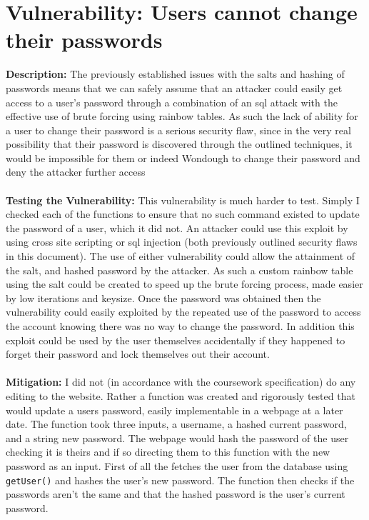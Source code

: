 \section{Vulnerability: Users cannot change their passwords}
\label{sec:background}
\textbf{Description:} The previously established issues with the salts and hashing of passwords means that we can safely assume that an attacker could easily get access to a user's
password through a combination of an sql attack with the effective use of brute forcing using rainbow tables. As such the lack of ability for a user to change their password is a
serious security flaw, since in the very real possibility that their password is discovered through the outlined techniques, it would be impossible for them or indeed Wondough to
change their password and deny the attacker further access \\ \\
\textbf{Testing the Vulnerability:} This vulnerability is much harder to test. Simply I checked each of the functions to ensure that no such command existed to update the password
of a user, which it did not. An attacker could use this exploit by using cross site scripting or sql injection (both previously outlined security flaws in this document). The use
of either vulnerability could allow the attainment of the salt, and hashed password by the attacker. As such a custom rainbow table using the salt could be created to speed up the
brute forcing process, made easier by low iterations and keysize. Once the password was obtained then the vulnerability could easily exploited by the repeated use of the password
to access the account knowing there was no way to change the password. In addition this exploit could be used by the user themselves accidentally if they happened to forget their password
and lock themselves out their account. \\ \\
\textbf{Mitigation:} I did not (in accordance with the coursework specification) do any editing to the website. Rather a function was created and rigorously tested that would update
a users password, easily implementable in a webpage at a later date. The function took three inputs, a username, a hashed current password, and a string new password. The webpage
would hash the password of the user checking it is theirs and if so directing them to this function with the new password as an input. First of all the fetches the user from the
database using \verb|getUser()| and hashes the user's new password. The function then checks if the passwords aren't the same and that the hashed password is the user's current password.
